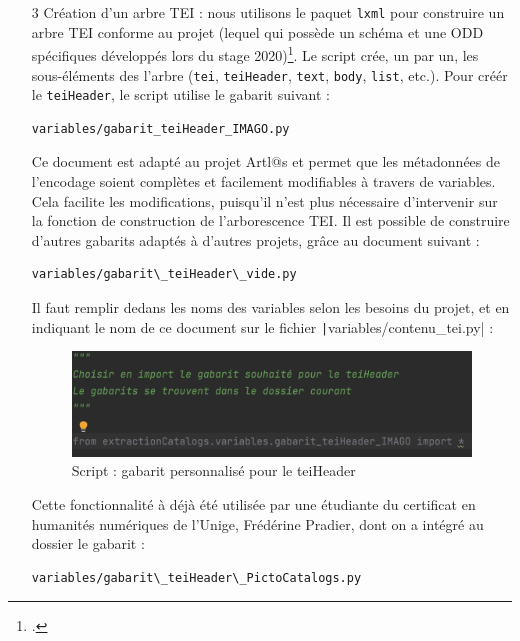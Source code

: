 \documentclass[a4paper,12pt,twoside]{book}
\begin{document}
\begin{itemize}
\item [3] Création d'un arbre TEI : nous utilisons le paquet \texttt{lxml} pour construire un arbre TEI conforme au projet (lequel qui possède un schéma et une ODD spécifiques développés lors du stage 2020)\footcite{corbieres_du_2020}. Le script crée, un par un, les sous-éléments des l'arbre (\texttt{tei}, \texttt{teiHeader}, \texttt{text}, \texttt{body}, \texttt{list}, etc.). Pour créér le \texttt{teiHeader}, le script utilise le gabarit suivant : 
\begin{normalsize}
	\begin{verbatim}
variables/gabarit_teiHeader_IMAGO.py
	\end{verbatim}
\end{normalsize}
Ce document est adapté au projet Artl@s et permet que les métadonnées de l'encodage soient complètes et facilement modifiables à travers de variables. Cela facilite les modifications, puisqu'il n'est plus nécessaire d'intervenir sur la fonction de construction de l'arborescence TEI. Il est possible de construire d'autres gabarits adaptés à d'autres projets, grâce au document suivant :
\begin{normalsize}
	\begin{verbatim}
variables/gabarit\_teiHeader\_vide.py
	\end{verbatim}
\end{normalsize}
Il faut remplir dedans les noms des variables selon les besoins du projet, et en indiquant le nom de ce document sur le fichier \texttt|variables/contenu_tei.py| :
\begin{figure}[ht]
	\centering
	\includegraphics[scale=0.5]{gabarit.png}		
	\caption{Script : gabarit personnalisé pour le teiHeader}
\end{figure}

Cette fonctionnalité à déjà été utilisée par une étudiante du certificat en humanités numériques de l'Unige, Frédérine Pradier, dont on a intégré au dossier le gabarit : 
\begin{normalsize}
	\begin{verbatim}
variables/gabarit\_teiHeader\_PictoCatalogs.py
	\end{verbatim}
\end{normalsize}


\end{itemize}
\end{document}
